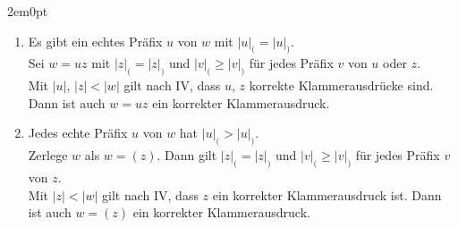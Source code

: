 \documentclass[12pt,a4paper,oneside]{article}
\begin{document}
\begin{adjustwidth}{2em}{0pt}
                \begin{enumerate}
                    \item Es gibt ein echtes Präfix $u$ von $w$ mit $|u|_( = |u|_)$. \\
                          Sei $w = uz$ mit $|z|_( = |z|_)$ und $|v|_( \geq |v|_)$ für jedes Präfix $v$ von $u$ oder $z$. \\
                          Mit $|u|$, $|z| < |w|$ gilt nach IV, dass $u$, $z$ korrekte Klammerausdrücke sind.
                          Dann ist auch $w = uz$ ein korrekter Klammerausdruck.
                    \item Jedes echte Präfix $u$ von $w$ hat $|u|_( > |u|_)$. \\
                          Zerlege $w$ als $w = (z)$.
                          Dann gilt $|z|_( = |z|_)$ und $|v|_( \geq |v|_)$ für jedes Präfix $v$ von $z$. \\
                          Mit $|z| < |w|$ gilt nach IV, dass $z$ ein korrekter Klammerausdruck ist.
                          Dann ist auch $w = (z)$ ein korrekter Klammerausdruck.
                \end{enumerate}

            \end{adjustwidth}
\end{document}
